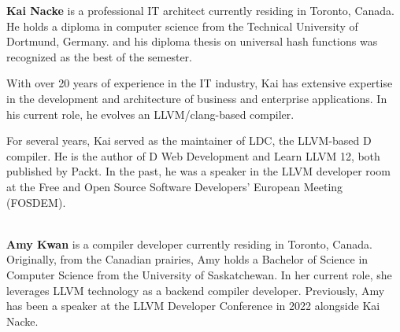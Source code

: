 \textbf{Kai Nacke} is a professional IT architect currently residing in Toronto, Canada. He holds a diploma in computer science from the Technical University of Dortmund, Germany. and his diploma thesis on universal hash functions was recognized as the best of the semester.

With over 20 years of experience in the IT industry, Kai has extensive expertise in the development and architecture of business and enterprise applications. In his current role, he evolves an LLVM/clang-based compiler.

For several years, Kai served as the maintainer of LDC, the LLVM-based D compiler. He is the author of D Web Development and Learn LLVM 12, both published by Packt. In the past, he was a speaker in the LLVM developer room at the Free and Open Source Software Developers’ European Meeting (FOSDEM).

\hspace*{\fill} \\

\textbf{Amy Kwan} is a compiler developer currently residing in Toronto, Canada. Originally, from the Canadian prairies, Amy holds a Bachelor of Science in Computer Science from the University of Saskatchewan.
In her current role, she leverages LLVM technology as a backend compiler developer. Previously, Amy has been a speaker at the LLVM Developer Conference in 2022 alongside Kai Nacke.




















